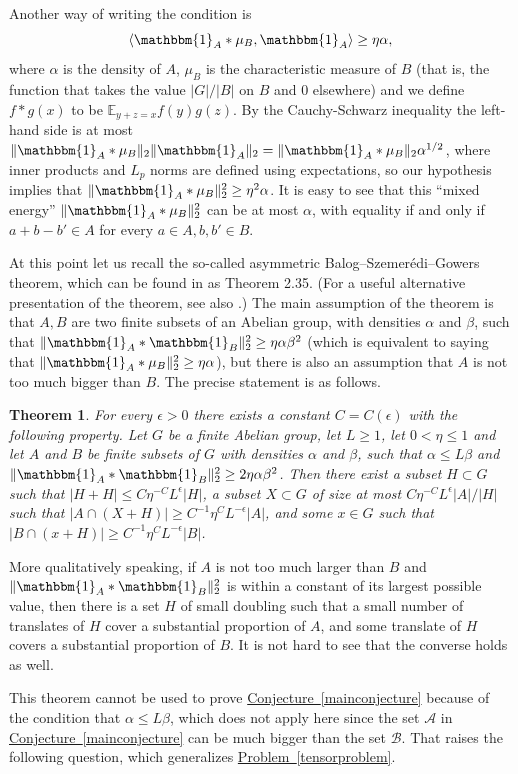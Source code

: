 \documentclass[11pt]{article}
\numberwithin{equation}{section}
\newtheorem{theorem}{Theorem}[section]
\theoremstyle{definition}
\theoremstyle{plain}
\newcommand{\expref}[2]{\hyperref[#2]{#1~\ref{#2}}}
\newcommand\eps{\epsilon}  %
\newcommand\E{\mathbb{E}}
\renewcommand\a{\alpha}
\newcommand\be{\beta}
\newcommand{\ind}{\mathbbm{1}}
\renewcommand\AA{\ind_A}
\newcommand\BB{\ind_B}
\newcommand \cA{\mathcal A}
\newcommand \cB{\mathcal B}
\begin{document}
Another way of writing the condition is
\[\langle \AA*\mu_B,\AA\rangle\geq\eta\a,\]
where $\a$ is the density of $A$, $\mu_B$ is the characteristic measure of $B$ (that is, the function that takes the value $|G|/|B|$ on $B$ and 0 elsewhere) and we define $f*g(x)$ to be $\E_{y+z=x}f(y)g(z)$. By the Cauchy-Schwarz inequality the left-hand side is at most $\|\AA*\mu_B\|_2\|\AA\|_2=\|\AA*\mu_B\|_2\a^{1/2}$, where inner products and $L_p$ norms are defined using expectations, so our hypothesis implies that $\|\AA*\mu_B\|_2^2\geq\eta^2\a$. It is easy to see that this ``mixed energy'' $\|\AA*\mu_B\|_2^2$ can be at most $\a$, with equality if and only if $a+b-b'\in A$ for every $a\in A, b,b'\in B$. 

At this point let us recall the so-called asymmetric Balog--Szemer\'edi--Gowers theorem, which can be found in \cite{taovu} as Theorem 2.35. (For a useful alternative presentation of the theorem, see also \cite{greenBSG}.) The main assumption of the theorem is that $A,B$ are two finite subsets of an Abelian group, with densities $\a$ and $\be$, such that $\|\AA*\BB\|_2^2\geq\eta\a\be^2$ (which is equivalent to saying that $\|\AA*\mu_B\|_2^2\geq\eta\a$), but there is also an assumption that $A$ is not too much bigger than $B$. The precise statement is as follows.

\begin{theorem} \label{asym}
	For every $\eps>0$ there exists a constant $C=C(\eps)$ with the following property. Let $G$ be a finite Abelian group, let $L\geq 1$, let $0<\eta\leq 1$ and let $A$ and $B$ be finite subsets of $G$ with densities $\a$ and $\be$, such that $\a\leq L\be$ and $\|\AA*\BB\|_2^2\geq 2\eta\a\be^2$. Then there exist a subset $H\subset G$ such that $|H+H|\leq C\eta^{-C}L^\eps|H|$, a subset $X\subset G$ of size at most $C\eta^{-C}L^\eps|A|/|H|$ such that $|A\cap(X+H)|\geq C^{-1}\eta^CL^{-\eps}|A|$, and some $x\in G$ such that $|B\cap(x+H)|\geq C^{-1}\eta^CL^{-\eps}|B|$.
\end{theorem}

\noindent More qualitatively speaking, if $A$ is not too much larger than $B$ and $\|\AA*\BB\|_2^2$ is within a constant of its largest possible value, then there is a set $H$ of small doubling such that a small number of translates of $H$ cover a substantial proportion of $A$, and some translate of $H$ covers a substantial proportion of $B$. It is not hard to see that the converse holds as well.

This theorem cannot be used to prove \expref{Conjecture}{mainconjecture} because of the condition that $\a\leq L\be$, which does not apply here since the set $\cA$ in \expref{Conjecture}{mainconjecture} can be much bigger than the set $\cB$. That raises the following question, which generalizes \expref{Problem}{tensorproblem}.
\end{document}
